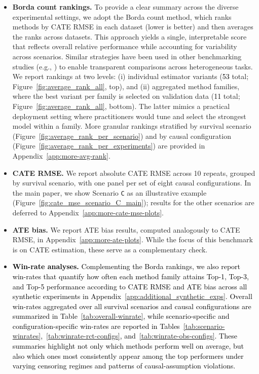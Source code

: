 \documentclass{article} %
\newcommand{\rebuttal}[1]{\textcolor{black}{#1}}
\begin{document}
\begin{itemize}[leftmargin=*,itemsep=-1.5pt,topsep=0pt]
    \item \textbf{Borda count rankings.} {To provide a clear summary across the diverse experimental settings, we adopt the Borda count method, which ranks methods by CATE RMSE in each dataset (lower is better) and then averages the ranks across datasets. This approach yields a single, interpretable score that reflects overall relative performance while accounting for variability across scenarios. Similar strategies have been used in other benchmarking studies (e.g., \citealt{han2022adbench}) to enable transparent comparisons across heterogeneous tasks. We report rankings at two levels: (i) individual estimator variants (\rebuttal{53} total; Figure~\ref{fig:average_rank_all}, top), and (ii) aggregated method families, where the best variant per family is selected on validation data (\rebuttal{11} total; Figure~\ref{fig:average_rank_all}, bottom). The latter mimics a practical deployment setting where practitioners would tune and select the strongest model within a family. More granular rankings stratified by survival scenario (Figure~\ref{fig:average_rank_per_scenario}) and by causal configuration (Figure~\ref{fig:average_rank_per_experiments}) are provided in Appendix~\ref{app:more-avg-rank}.}
    
    \item \textbf{CATE RMSE.} We report absolute CATE RMSE across 10 repeats, grouped by survival scenario, with one panel per set of eight causal configurations. In the main paper, we show Scenario \texttt{C} as an illustrative example (Figure~\ref{fig:cate_mse_scenario_C_main}); results for the other scenarios are deferred to Appendix~\ref{app:more-cate-mse-plots}.

    \item \textbf{ATE bias.} We report ATE bias results, computed analogously to CATE RMSE, in Appendix~\ref{app:more-ate-plots}. While the focus of this benchmark is on CATE estimation, these serve as a complementary check.

    \item \rebuttal{\textbf{Win-rate analyses.} Complementing the Borda rankings, we also report win-rates that quantify how often each method family attains Top-1, Top-3, and Top-5 performance according to CATE RMSE and ATE bias across all synthetic experiments in Appendix~\ref{app:additional_synthetic_exps}. Overall win-rates aggregated over all survival scenarios and causal configurations are summarized in Table~\ref{tab:overall-winrate}, while scenario-specific and configuration-specific win-rates are reported in Tables~\ref{tab:scenario-winrates},~\ref{tab:winrate-rct-configs}, and~\ref{tab:winrate-obs-configs}. These summaries highlight not only which methods perform well on average, but also which ones most consistently appear among the top performers under varying censoring regimes and patterns of causal-assumption violations.}
\end{itemize}
\end{document}

